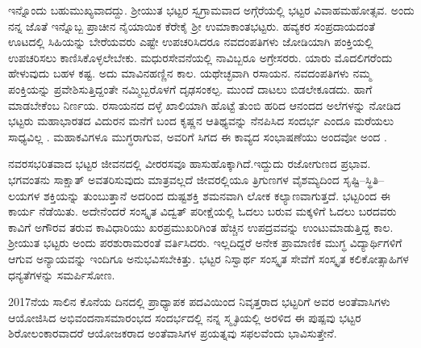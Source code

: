{ಇನ್ನೊಂದು ಬಹುಮುಖ್ಯವಾದದ್ದು. ಶ್ರೀಯುತ ಭಟ್ಟರ ಸ್ವಗ್ರಾಮವಾದ ಅಗ್ಗೆರೆಯಲ್ಲಿ ಭಟ್ಟರ ವಿವಾಹಮಹೋತ್ಸವ. ಅಂದು ನನ್ನ ಜೊತೆ ಇನ್ನೊಬ್ಬ ಪ್ರಾಚೀನ ನೈಯಾಯಿಕ ಕೆರೇಕೈ ಶ್ರೀ ಉಮಾಕಾಂತಭಟ್ಟರು. ಹವ್ಯಕರ ಸಂಪ್ರದಾಯದಂತೆ ಊಟದಲ್ಲಿ ಸಿಹಿಯನ್ನು ಬೇರೆಯವರು ಎಷ್ಟೇ ಉಪಚರಿಸಿದರೂ ನವದಂಪತಿಗಳು ಜೋಡಿಯಾಗಿ ಪಂಕ್ತಿಯಲ್ಲಿ ಉಪಚರಿಸಲು ಕಾಣಿಸಿಕೊಳ್ಳಲೇಬೇಕು. ಮಧುರಸೇವನೆಯಲ್ಲಿ ನಾವಿಬ್ಬರೂ ಅಗ್ರೇಸರರು. ಯಾರು ಮೊದಲಿಗರೆಂದು ಹೇಳುವುದು ಬಹಳ ಕಷ್ಟ. ಅದು ಮಾವಿನಹಣ್ಣಿನ ಕಾಲ. ಯಥೇಚ್ಛವಾಗಿ ರಸಾಯನ. ನವದಂಪತಿಗಳು ನಮ್ಮ ಪಂಕ್ತಿಯನ್ನು ಪ್ರವೇಶಿಸುತ್ತಿದ್ದಂತೇ ನಮ್ಮಿಬ್ಬರೊಳಗೆ ದೃಢಸಂಕಲ್ಪ. ಮುಂದೆ ದಾಟಲು ಬಿಡಲೇಕೂಡದು. ಹಾಗೆ ಮಾಡಬೇಕೆಂಬ ನಿರ್ಣಯ. ರಸಾಯನದ ದಳ್ಳೆ ಖಾಲಿಯಾಗಿ ಹೊಟ್ಟೆ ತುಂಬಿ ಹರಿದ ಆನಂದದ ಅಲೆಗಳನ್ನು ನೋಡಿದ ಭಟ್ಟರು ಮಹಾಭಾರತದ ವಿದುರನ ಮನೆಗೆ ಬಂದ ಕೃಷ್ಣನ ಆತಿಥ್ಯವನ್ನು ನೆನಪಿಸಿದ ಸಂದರ್ಭ ಎಂದೂ ಮರೆಯಲು ಸಾಧ್ಯವಿಲ್ಲ . ಮಹಾಕವಿಗಳೂ ಮುಗ್ಧರಾಗುವ, ಅವರಿಗೆ ಸಿಗದ ಈ ಕಾವ್ಯದ ಸಂಭಾಷಣೆಯು ಅಂದವೋ ಅಂದ .

ನವರಸಭರಿತವಾದ ಭಟ್ಟರ ಜೀವನದಲ್ಲಿ ವೀರರಸವೂ ಹಾಸುಹೊಕ್ಕಾಗಿದೆ.ಇದ್ದುದು ರಜೋಗುಣದ ಪ್ರಭಾವ. ಭಗವಂತನು ಸಾಕ್ಷಾತ್ ಅವತರಿಸುವುದು ಮಾತ್ರವಲ್ಲದೆ ಜೀವರಲ್ಲಿಯೂ ತ್ರಿಗುಣಗಳ ವೈಶಮ್ಯದಿಂದ ಸೃಷ್ಟಿ–ಸ್ಥಿತಿ–ಲಯಗಳ ಶಕ್ತಿಯನ್ನು ತುಂಬುತ್ತಾನೆ ಅದರಿಂದ ದುಷ್ಟಶಕ್ತಿ ಶಮನವಾಗಿ \break ಲೋಕ ಕಲ್ಯಾಣವಾಗುತ್ತದೆ. ಭಟ್ಟರಿಂದ ಈ ಕಾರ್ಯ ನೆಡೆಯಿತು. ಅದೇನೆಂದರೆ ಸಂಸ್ಕೃತ ವಿದ್ವತ್ ಪರೀಕ್ಷೆಯಲ್ಲಿ ಓದಲು ಬರುವ ಮಕ್ಕಳಿಗೆ ಓದಲು ಬರದವರು ಕಾವಿಗೆ ಅಗೌರವ ತರುವ ಕಾವಿಧಾರಿಯು ಖರಪ್ರಮುಖರಿಗಿಂತ ಹೆಚ್ಚಿನ ಉಪದ್ರವವನ್ನು ಉಂಟುಮಾಡುತ್ತಿದ್ದ ಕಾಲ. ಶ್ರೀಯುತ ಭಟ್ಟರು ಅಂದು ಪರಶುರಾಮರಂತೆ ವರ್ತಿಸಿದರು. ಇಲ್ಲದಿದ್ದರೆ ಅನೇಕ ಪ್ರಾಮಾಣಿಕ ಮುಗ್ಧ ವಿದ್ಯಾರ್ಥಿಗಳಿಗೆ ಆಗುವ ಅನ್ಯಾಯವನ್ನು ಇಂದಿಗೂ ಅನುಭವಿಸಬೇಕಿತ್ತು. ಭಟ್ಟರ ನಿಸ್ವಾರ್ಥ ಸಂಸ್ಕೃತ ಸೇವೆಗೆ ಸಂಸ್ಕೃತ ಕಲಿಕೋತ್ಸಾಹಿಗಳ ಧನ್ಯತೆಗಳನ್ನು ಸಮರ್ಪಿಸೋಣ.


2017ನೆಯ ಸಾಲಿನ ಕೊನೆಯ ದಿನದಲ್ಲಿ ಪ್ರಾಧ್ಯಾಪಕ ಪದವಿಯಿಂದ ನಿವೃತ್ತರಾದ ಭಟ್ಟರಿಗೆ ಅವರ ಅಂತೆವಾಸಿಗಳು ಆಯೋಜಿಸಿದ ಅಭಿವಂದನಾಸಮಾರಂಭದ ಸಂದರ್ಭದಲ್ಲಿ ನನ್ನ ಸ್ಮೃತಿಯಲ್ಲಿ ಅರಳಿದ ಈ ಪುಷ್ಪವು ಭಟ್ಟರ ಶಿರೋಲಂಕಾರವಾದರೆ  ಆಯೋಜಕರಾದ ಅಂತೆವಾಸಿಗಳ ಪ್ರಯತ್ನವು ಸಫಲವೆಂದು ಭಾವಿಸುತ್ತೇನೆ.

\articleend
}
